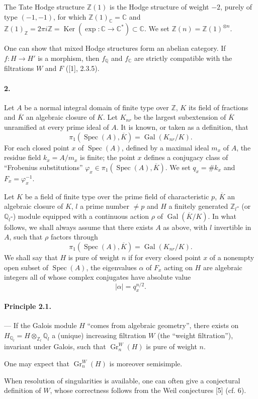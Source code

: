 \documentclass[10pt]{article}
\newcommand{\C}{\mathbb C}
\newcommand{\Q}{\mathbb Q}
\newcommand{\Z}{\mathbb Z}
\newcommand{\Gr}{\operatorname{Gr}}
\newcommand{\Gal}{\operatorname{Gal}}
\newcommand{\Spec}{\operatorname{Spec}}
\newcommand{\Ker}{\operatorname{Ker}}
\newcommand{\barK}{\overline{K}}
\begin{document}
The Tate Hodge structure $\Z(1)$ is the Hodge structure of weight $-2$, purely of type $(-1,-1)$, for which $\Z(1)_\C=\C$ and $\Z(1)_\Z=2\pi i\Z=\Ker(\exp:\C\to\C^*)\subset\C$. We set $\Z(n)=\Z(1)^{\otimes n}$.

One can show that mixed Hodge structures form an abelian category. If $f:H\to H'$ is a morphism, then $f_\Q$ and $f_\C$ are strictly compatible with the filtrations $W$ and $F$ ([1], 2.3.5).

\paragraph{2.} Let $A$ be a normal integral domain of finite type over $\Z$, $K$ its field of fractions and $\barK$ an algebraic closure of $K$. Let $K_{nr}$ be the largest subextension of $\barK$ unramified at every prime ideal of $A$. It is known, or taken as a definition, that
\[
\pi_1(\Spec(A),\barK)=\Gal(K_{nr}/K).
\]
For each closed point $x$ of $\Spec(A)$, defined by a maximal ideal $m_x$ of $A$, the residue field $k_x=A/m_x$ is finite; the point $x$ defines a conjugacy class of “Frobenius substitutions” $\varphi_x\in\pi_1(\Spec(A),\barK)$. We set $q_x=\#k_x$ and $F_x=\varphi_x^{-1}$.

Let $K$ be a field of finite type over the prime field of characteristic $p$, $\barK$ an algebraic closure of $K$, $l$ a prime number $\ne p$ and $H$ a finitely generated $\Z_l$- (or $\Q_l$-) module equipped with a continuous action $\rho$ of $\Gal(\barK/K)$. In what follows, we shall always assume that there exists $A$ as above, with $l$ invertible in $A$, such that $\rho$ factors through
\[
\pi_1(\Spec(A),\barK)=\Gal(K_{nr}/K).
\]
We shall say that $H$ is pure of weight $n$ if for every closed point $x$ of a nonempty open subset of $\Spec(A)$, the eigenvalues $\alpha$ of $F_x$ acting on $H$ are algebraic integers all of whose complex conjugates have absolute value
\[
|\alpha|=q_x^{n/2}.
\]

\paragraph{Principle 2.1.} — If the Galois module $H$ “comes from algebraic geometry”, there exists on $H_{\Q_l}=H\otimes_{\Z_l}\Q_l$ a (unique) increasing filtration $W$ (the “weight filtration”), invariant under Galois, such that $\Gr_n^W(H)$ is pure of weight $n$.

One may expect that $\Gr_n^W(H)$ is moreover semisimple.

When resolution of singularities is available, one can often give a conjectural definition of $W$, whose correctness follows from the Weil conjectures [5] (cf. 6).
\end{document}
